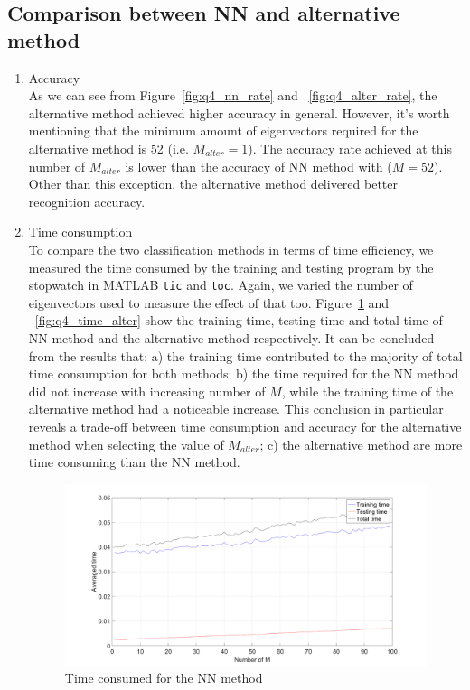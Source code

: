 \documentclass[10pt,twocolumn,letterpaper]{article}
\begin{document}
\subsection{Comparison between NN and alternative method}
\begin{enumerate}
	\item Accuracy\\
	As we can see from Figure~\ref{fig:q4_nn_rate} and ~\ref{fig:q4_alter_rate}, the alternative method achieved higher accuracy in general. However, it's worth mentioning that the minimum amount of eigenvectors required for the alternative method is 52 (i.e. $M_{alter} = 1$). The accuracy rate achieved at this number of $M_{alter}$ is lower than the accuracy of NN method with ($M = 52$). Other than this exception, the alternative method delivered better recognition accuracy.\\
	
	\item Time consumption\\
	To compare the two classification methods in terms of time efficiency, we measured the time consumed by the training and testing program by the stopwatch in MATLAB \texttt{tic} and \texttt{toc}. Again, we varied the number of eigenvectors used to measure the effect of that too. Figure~\ref{fig:q4_time_nn} and ~\ref{fig:q4_time_alter} show the training time, testing time and total time of NN method and the alternative method respectively. It can be concluded from the results that: a) the training time contributed to the majority of total time consumption for both methods; b) the time required for the NN method did not increase with increasing number of $M$, while the training time of the alternative method had a noticeable increase. This conclusion in particular reveals a trade-off between time consumption and accuracy for the alternative method when selecting the value of $M_{alter}$; c) the alternative method are more time consuming than the NN method. 
	
	\begin{figure}
		\begin{center}
			\includegraphics[width=0.9\linewidth]{time_NN}
			\caption{Time consumed for the NN method}
			\label{fig:q4_time_nn}
		\end{center}
	\end{figure}
	

\end{enumerate}
\end{document}
